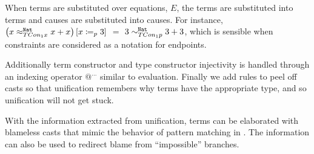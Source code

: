 
When terms are substituted over equations, $E$, the terms are substituted into terms and causes are substituted into causes.
For instance, 
  $\left(x \approx_{TCon_{1}x}^{\mathtt{Nat}{}}x+x\right) \left[x\coloneqq_{p} 3\right]$ $=$ $3 \sim_{TCon_{1}p}^{\mathtt{Nat}{}}3+3$,
  which is sensible when constraints are considered as a notation for endpoints.

Additionally term constructor and type constructor injectivity is handled through an indexing operator $@^{...}$ similar to evaluation.
Finally we add rules to peel off casts so that unification remembers why terms have the appropriate type, and so unification will not get stuck.

With the information extracted from unification, terms can be elaborated with blameless casts that mimic the behavior of pattern matching in .
The information can also be used to redirect blame from ``impossible'' branches.
